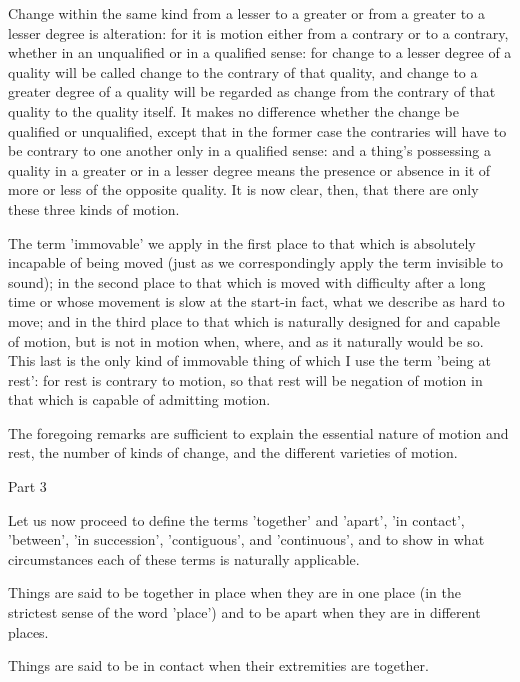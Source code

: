 Change within the same kind from a lesser to a greater or from a greater
to a lesser degree is alteration: for it is motion either from a contrary
or to a contrary, whether in an unqualified or in a qualified sense:
for change to a lesser degree of a quality will be called change to
the contrary of that quality, and change to a greater degree of a
quality will be regarded as change from the contrary of that quality
to the quality itself. It makes no difference whether the change be
qualified or unqualified, except that in the former case the contraries
will have to be contrary to one another only in a qualified sense:
and a thing's possessing a quality in a greater or in a lesser degree
means the presence or absence in it of more or less of the opposite
quality. It is now clear, then, that there are only these three kinds
of motion. 

The term 'immovable' we apply in the first place to that which is
absolutely incapable of being moved (just as we correspondingly apply
the term invisible to sound); in the second place to that which is
moved with difficulty after a long time or whose movement is slow
at the start-in fact, what we describe as hard to move; and in the
third place to that which is naturally designed for and capable of
motion, but is not in motion when, where, and as it naturally would
be so. This last is the only kind of immovable thing of which I use
the term 'being at rest': for rest is contrary to motion, so that
rest will be negation of motion in that which is capable of admitting
motion. 

The foregoing remarks are sufficient to explain the essential nature
of motion and rest, the number of kinds of change, and the different
varieties of motion. 

Part 3

Let us now proceed to define the terms 'together' and 'apart', 'in
contact', 'between', 'in succession', 'contiguous', and 'continuous',
and to show in what circumstances each of these terms is naturally
applicable. 

Things are said to be together in place when they are in one place
(in the strictest sense of the word 'place') and to be apart when
they are in different places. 

Things are said to be in contact when their extremities are together.

